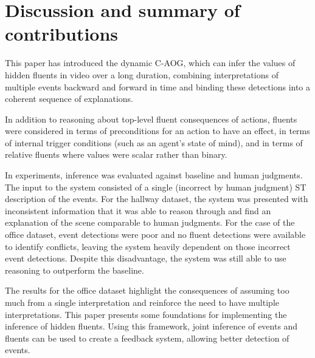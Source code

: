 \documentclass[10pt,journal,letterpaper,compsoc]{IEEEtran}
\begin{document}
\section{Discussion and summary of contributions}

This paper has introduced the dynamic C-AOG, which can infer the values of hidden fluents in video over a long duration, combining interpretations of multiple events backward and forward in time and binding these detections into a coherent sequence of explanations.

In addition to reasoning about top-level fluent consequences of actions, fluents were considered in terms of preconditions for an action to have an effect, in terms of internal trigger conditions (such as an agent's state of mind), and in terms of relative fluents where values were scalar rather than binary.

In experiments, inference was evaluated against baseline and human judgments.  The input to the system consisted of a single (incorrect by human judgment) ST description of the events.  For the hallway dataset, the system was presented with inconsistent information that it was able to reason through and find an explanation of the scene comparable to human judgments.  For the case of the office dataset, event detections were poor and no fluent detections were available to identify conflicts, leaving the system heavily dependent on those incorrect event detections.  Despite this disadvantage, the system was still able to use reasoning to outperform the baseline.

The results for the office dataset highlight the consequences of assuming too much from a single interpretation and reinforce the need to have multiple interpretations.  This paper presents some foundations for implementing the inference of hidden fluents.  Using this framework, joint inference of events and fluents can be used to  create a feedback system, allowing better detection of events.




\end{document}

